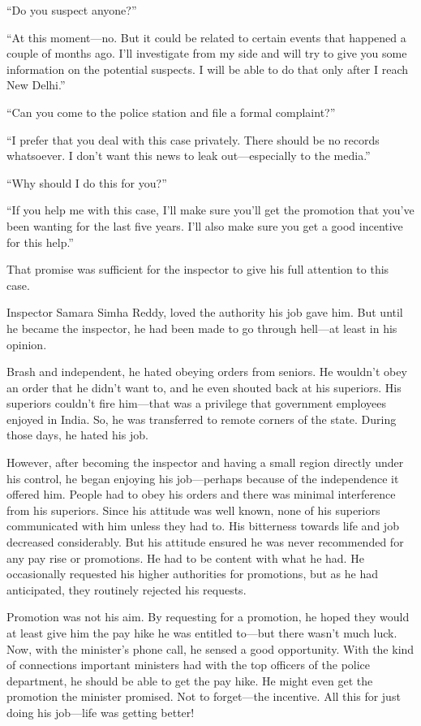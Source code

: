 “Do you suspect anyone?”

“At this moment—no. But it could be related to certain events that happened a
couple of months ago. I'll investigate from my side and will try to give you
some information on the potential suspects. I will be able to do that only after
I reach New Delhi.”

“Can you come to the police station and file a formal complaint?”

“I prefer that you deal with this case privately. There should be no records
whatsoever. I don't want this news to leak out—especially to the media.”

“Why should I do this for you?”

“If you help me with this case, I'll make sure you'll get the promotion that
you've been wanting for the last five years. I'll also make sure you
get a good incentive for this help.”

That promise was sufficient for the inspector to give his full attention to this
case.

Inspector Samara Simha Reddy, loved the authority his job gave him. But until he
became the inspector, he had been made to go through hell—at least in his opinion.

Brash and independent, he hated obeying orders from seniors. He wouldn't obey an
order that he didn't want to, and he even shouted back at his superiors.  His
superiors couldn't fire him—that was a privilege that government employees
enjoyed in India. So, he was transferred to remote corners of the state.  During
those days, he hated his job.

However, after becoming the inspector and having a small region directly under 
his control, he began enjoying his job—perhaps because of the 
independence it offered him. People had to obey his orders and there was minimal interference from his
superiors. Since his attitude was well known, none of his superiors communicated
with him unless they had to. His bitterness towards life and job decreased
considerably. But his attitude ensured he was never recommended for any pay rise
or promotions. He had to be content with what he had. He occasionally requested
his higher authorities for promotions, but as he had anticipated, they routinely
rejected his requests.

Promotion was not his aim. By requesting for a promotion, he hoped they would at
least give him the pay hike he was entitled to—but there wasn't much luck.
Now, with the minister's phone call, he sensed a good opportunity. With the kind
of connections important ministers had with the top officers of the police
department, he should be able to get the pay hike. He might even get the
promotion the minister promised. Not to forget—the incentive. All this for
just doing his job—life was getting better!